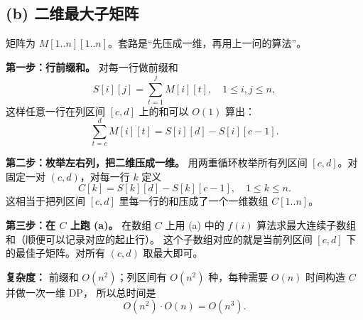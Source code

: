 \documentclass[12pt,a4paper,oneside]{ctexart}
\begin{document}
\subsection*{(b) 二维最大子矩阵}

矩阵为 $M[1..n][1..n]$。套路是“先压成一维，再用上一问的算法”。

\textbf{第一步：行前缀和。}  
对每一行做前缀和
\[
S[i][j]=\sum_{t=1}^j M[i][t],\quad 1\le i,j\le n,
\]
这样任意一行在列区间 $[c,d]$ 上的和可以 $O(1)$ 算出：
\[
\sum_{t=c}^d M[i][t]=S[i][d]-S[i][c-1].
\]

\textbf{第二步：枚举左右列，把二维压成一维。}  
用两重循环枚举所有列区间 $[c,d]$。对固定一对 $(c,d)$，对每一行 $k$ 定义
\[
C[k]=S[k][d]-S[k][c-1],\quad 1\le k\le n.
\]
这相当于把列区间 $[c,d]$ 里每一行的和压成了一个一维数组 $C[1..n]$。

\textbf{第三步：在 $C$ 上跑 (a)。}  
在数组 $C$ 上用 (a) 中的 $f(i)$ 算法求最大连续子数组和（顺便可以记录对应的起止行）。
这个子数组对应的就是当前列区间 $[c,d]$ 下的最佳子矩阵。对所有 $(c,d)$ 取最大即可。

\textbf{复杂度：}  
前缀和 $O(n^2)$；列区间有 $O(n^2)$ 种，每种需要 $O(n)$ 时间构造 $C$ 并做一次一维 DP，
所以总时间是
\[
O(n^2)\cdot O(n)=O(n^3).
\]
\end{document}
